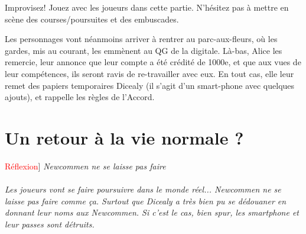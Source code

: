 \documentclass[10pt,a4paper,twocolumn]{article}
\newenvironment{lAbstract}[1]{{[}\textcolor{red}{#1}{]}\itshape}{\\ \\}
\begin{document}
Improvisez! Jouez avec les joueurs dans cette partie. N'hésitez pas à mettre en scène des courses/poursuites et des embuscades.

Les personnages vont néanmoins arriver à rentrer au parc-aux-fleurs, où les gardes, mis au courant, les emmènent au QG de la digitale. Là-bas, Alice les remercie, leur annonce que leur compte a été crédité de 1000e, et que aux vues de leur compétences, ils seront ravis de re-travailler avec eux. En tout cas, elle leur remet des papiers temporaires Dicealy (il s'agit d'un smart-phone avec quelques ajouts), et rappelle les règles de l'Accord.

\section{Un retour à la vie normale ?}
\begin{lAbstract}{Réflexion}
Newcommen ne se laisse pas faire
\end{lAbstract}
Les joueurs vont se faire poursuivre dans le monde réel... Newcommen ne se laisse pas faire comme ça. Surtout que Dicealy a très bien pu se dédouaner en donnant leur noms aux Newcommen. Si c'est le cas, bien spur, les smartphone et leur passes sont détruits.

\newpage
\end{document}
